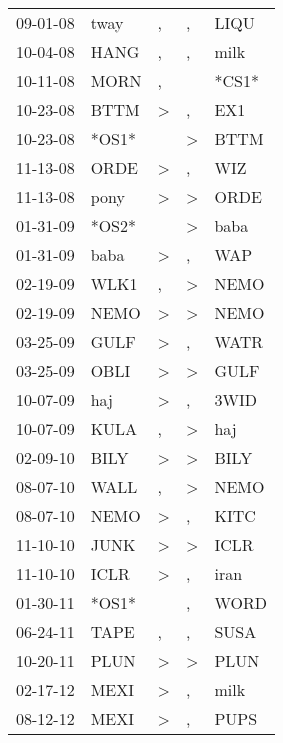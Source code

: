 \begin{supertabular}{lllll}
 09-01-08 &   tway &             , &                , &   LIQU \\
 10-04-08 &   HANG &             , &                , &   milk \\
 10-11-08 &   MORN &             , &                  &  *CS1* \\
 10-23-08 &   BTTM &  \textgreater &                , &    EX1 \\
 10-23-08 &  *OS1* &               &     \textgreater &   BTTM \\
 11-13-08 &   ORDE &  \textgreater &                , &    WIZ \\
 11-13-08 &   pony &  \textgreater &     \textgreater &   ORDE \\
 01-31-09 &  *OS2* &               &     \textgreater &   baba \\
 01-31-09 &   baba &  \textgreater &                , &    WAP \\
 02-19-09 &   WLK1 &             , &     \textgreater &   NEMO \\
 02-19-09 &   NEMO &  \textgreater &     \textgreater &   NEMO \\
 03-25-09 &   GULF &  \textgreater &                , &   WATR \\
 03-25-09 &   OBLI &  \textgreater &     \textgreater &   GULF \\
 10-07-09 &    haj &  \textgreater &                , &   3WID \\
 10-07-09 &   KULA &             , &     \textgreater &    haj \\
 02-09-10 &   BILY &  \textgreater &     \textgreater &   BILY \\
 08-07-10 &   WALL &             , &     \textgreater &   NEMO \\
 08-07-10 &   NEMO &  \textgreater &                , &   KITC \\
 11-10-10 &   JUNK &  \textgreater &     \textgreater &   ICLR \\
 11-10-10 &   ICLR &  \textgreater &                , &   iran \\
 01-30-11 &  *OS1* &               &                , &   WORD \\
 06-24-11 &   TAPE &             , &                , &   SUSA \\
 10-20-11 &   PLUN &  \textgreater &     \textgreater &   PLUN \\
 02-17-12 &   MEXI &  \textgreater &                , &   milk \\
 08-12-12 &   MEXI &  \textgreater &                , &   PUPS \\

\end{supertabular}
